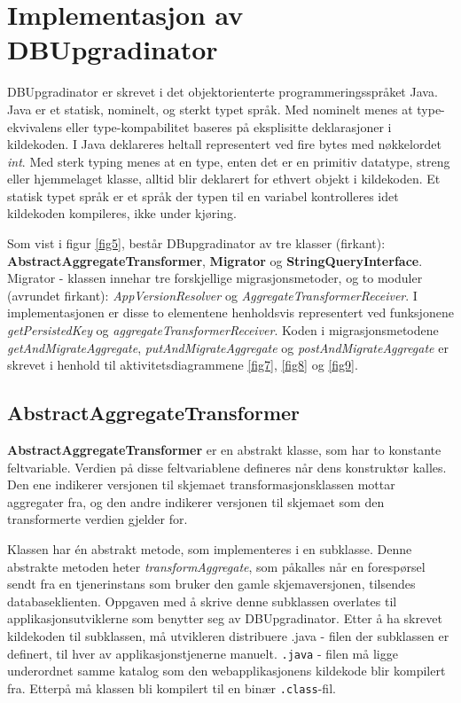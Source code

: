 \section{Implementasjon av DBUpgradinator}

DBUpgradinator er skrevet i det objektorienterte programmeringsspråket Java. Java er et statisk, nominelt, og sterkt typet språk. Med nominelt menes at type-ekvivalens eller type-kompabilitet baseres på eksplisitte deklarasjoner i kildekoden. I Java deklareres heltall representert ved fire bytes med nøkkelordet \emph{int}. Med sterk typing menes at en type, enten det er en primitiv datatype, streng eller hjemmelaget klasse, alltid blir deklarert for ethvert objekt i kildekoden. Et statisk typet språk er et språk der typen til en variabel kontrolleres idet kildekoden kompileres, ikke under kjøring.

Som vist i figur \ref{fig5}, består DBupgradinator av tre klasser (firkant): \textbf{AbstractAggregateTransformer}, \textbf{Migrator} og \textbf{StringQueryInterface}. Migrator - klassen innehar tre forskjellige migrasjonsmetoder, og to moduler (avrundet firkant): \emph{AppVersionResolver} og \emph{AggregateTransformerReceiver}. I implementasjonen er disse to elementene henholdsvis representert ved funksjonene \emph{getPersistedKey} og \emph{aggregateTransformerReceiver}. Koden i migrasjonsmetodene \emph{getAndMigrateAggregate}, \emph{putAndMigrateAggregate} og \emph{postAndMigrateAggregate} er skrevet i henhold til aktivitetsdiagrammene \ref{fig7}, \ref{fig8} og \ref{fig9}.

\subsection{AbstractAggregateTransformer}



\textbf{AbstractAggregateTransformer} er en abstrakt klasse, som har to konstante feltvariable. Verdien på disse feltvariablene defineres når dens konstruktør kalles. Den ene indikerer versjonen til skjemaet transformasjonsklassen mottar aggregater fra, og den andre indikerer versjonen til skjemaet som den transformerte verdien gjelder for.

Klassen har én abstrakt metode, som implementeres i en subklasse. Denne abstrakte metoden heter \emph{transformAggregate}, som påkalles når en forespørsel sendt fra en tjenerinstans som bruker den gamle skjemaversjonen, tilsendes databaseklienten. Oppgaven med å skrive denne subklassen overlates til applikasjonsutviklerne som benytter seg av DBUpgradinator. Etter å ha skrevet kildekoden til subklassen, må utvikleren distribuere .java - filen der subklassen er definert, til hver av applikasjonstjenerne manuelt. \texttt{.java} - filen må ligge underordnet samme katalog som den webapplikasjonens kildekode blir kompilert fra. Etterpå må klassen bli kompilert til en binær \texttt{.class}-fil.

